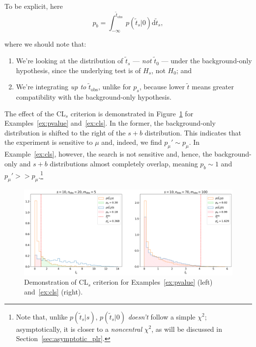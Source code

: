 To be explicit, here
\begin{equation}
p_b = \int^{\tilde{t}_{\mathrm{obs}}}_{-\infty}p(\tilde{t}_s|0)\mathrm d \tilde{t}_s,
\label{eq:pb}
\end{equation}

where we should note that:
\begin{enumerate}
    \item We're looking at the distribution of $\tilde{t}_s$ --- \textit{not} $\tilde{t}_0$ --- under the background-only hypothesis, since the underlying test is of $H_s$, not $H_0$; and
    \item We're integrating \textit{up to} $\tilde{t}_{\mathrm{obs}}$, unlike for $p_s$, because lower $\tilde{t}$ means greater compatibility with the background-only hypothesis.
\end{enumerate}

The effect of the CL$_s$ criterion is demonstrated in Figure~\ref{fig:cls} for Examples~\ref{ex:pvalue} and~\ref{ex:cls}.
In the former, the background-only distribution is shifted to the right of the $s+b$ distribution.
This indicates that the experiment is sensitive to $\mu$ and, indeed, we find $p_\mu' \sim p_\mu$.
In Example~\ref{ex:cls}, however, the search is not sensitive and, hence, the background-only and $s+b$ distributions almost completely overlap, meaning $p_b \sim 1$ and $p_\mu' >> p_\mu$.\footnote{Note that, unlike $p(\tilde{t}_s|s)$, $p(\tilde{t}_s|0)$ \textit{doesn't} follow a simple $\chi^2$; asymptotically, it is closer to a \textit{noncentral} $\chi^2$, as will be discussed in Section~\ref{sec:asymptotic_plr}.
}

\begin{figure}[htb]
\centering
\includegraphics[width=\textwidth]{figures/03-intervals-and-limits/5.png}
\captionsetup{justification=centering}
\caption{Demonstration of CL$_s$ criterion for Examples~\ref{ex:pvalue} (left) and~\ref{ex:cls} (right).}
\label{fig:cls}
\end{figure}

